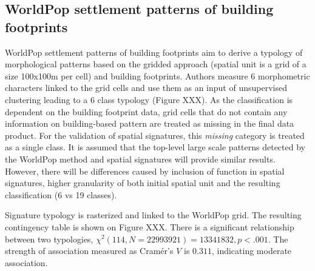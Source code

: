 \subsection*{WorldPop settlement patterns of building footprints}
WorldPop settlement patterns of building footprints aim to derive a typology of
morphological patterns based on the gridded approach (spatial unit is a grid of a size
100x100m per cell) and building footprints. Authors measure 6 morphometric characters
linked to the grid cells and use them as an input of unsupervised clustering leading to
a 6 class typology (Figure XXX).
As the classification is dependent on the building footprint data, grid cells that do
not contain any information on building-based pattern are treated as missing in the
final data product. For the validation of spatial signatures, this \textit{missing}
category is treated as a single class. It is assumed that the top-level large scale
patterns detected by the WorldPop method and spatial signatures will provide similar
results. However, there will be differences caused by inclusion of function in spatial
signatures, higher granularity of both initial spatial unit and the resulting
classification (6 vs 19 classes).

Signature typology is rasterized and linked to the WorldPop grid. The resulting
contingency table is shown on Figure XXX. There is a significant relationship between
two typologies, $\chi^{2} (114, N = 22993921) = 13341832, p < .001$. The strength of
association measured as Cramér's $V$ is $0.311$, indicating moderate association.

